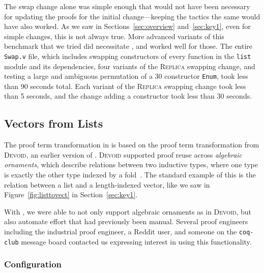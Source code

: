 The swap change alone was simple enough that \toolname would not have been necessary
for updating the proofs for the initial change---keeping the tactics the same would have also worked.
As we saw in Sections~\ref{sec:overview} and~\ref{sec:key1}, even for simple changes, this is not always true.
More advanced variants of this benchmark that we tried did necessitate \toolname,
and \toolname worked well for those. %
The entire \lstinline{Swap.v} file, which includes swapping constructors of every function in the \lstinline{list} module and
its dependencies, four variants of the \textsc{Replica} swapping change,
and testing a large and ambiguous permutation of a 30 constructor \lstinline{Enum},
took \toolname less than 90 seconds total. %
Each variant of the \textsc{Replica} swapping change took \toolname less than 5 seconds, %
and the change adding a constructor took \toolname less than 30 seconds. %

\subsection{Vectors from Lists}
\label{sec:dep}

The proof term transformation in \toolname is based on the proof term transformation from
\textsc{Devoid}, an earlier version of \toolname.
\textsc{Devoid} supported proof reuse across \textit{algebraic ornaments}, which describe relations
between two inductive types, where one type is exactly the other type indexed by a fold~\cite{mcbride}.
The standard example of this is the relation between a list and a
length-indexed vector, like we saw in Figure~\ref{fig:listtovect} in Section~\ref{sec:key1}.

With \toolname, we were able to not only support algebraic ornaments as in \textsc{Devoid},
but also automate effort that had previously been manual.
Several proof engineers including the industrial proof engineer, a Reddit user,
and someone on the \lstinline{coq-club} message board contacted us expressing interest in using this functionality.

\subsubsection{Configuration}

